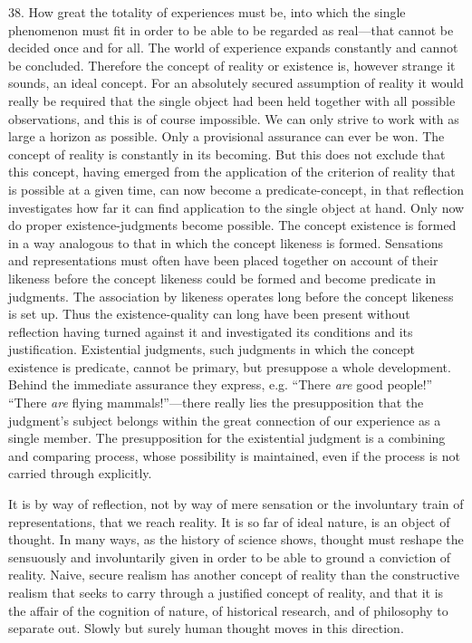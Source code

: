 \documentclass[12pt,a4paper]{book}
\newcommand{\opage}[1]{\marginnote{\footnotesize\textit{[#1]}}}
\begin{document}
38. How great the totality of experiences must be, into which the single
phenomenon must fit in order to be able to be regarded as real---that
cannot be decided once and for all. The world of experience expands
constantly and cannot be concluded. Therefore the concept of reality or
existence is, however strange it sounds, an ideal concept. For an
absolutely secured assumption of reality it would really be required that
the single object had been held together with all possible observations,
and this is of course impossible. We can only strive to work with as large
a horizon as possible. Only a provisional assurance can ever be won. The
concept of reality is constantly in its becoming. But this does not exclude
that this concept, having emerged from the application of the criterion of
reality that is possible at a given time, can now become a
predicate-concept, \opage{106}in that reflection investigates how far it can find
application to the single object at hand. Only now do proper
existence-judgments become possible. The concept existence is formed in a
way analogous to that in which the concept likeness is formed. Sensations
and representations must often have been placed together on account of
their likeness before the concept likeness could be formed and become
predicate in judgments. The association by likeness operates long before
the concept likeness is set up. Thus the existence-quality can long have
been present without reflection having turned against it and investigated
its conditions and its justification. Existential judgments, such judgments
in which the concept existence is predicate, cannot be primary, but
presuppose a whole development. Behind the immediate assurance they
express, e.g. ``There \emph{are} good people!'' ``There \emph{are} flying
mammals!''---there really lies the presupposition that the judgment's
subject belongs within the great connection of our experience as a single
member. The presupposition for the existential judgment is a combining and
comparing process, whose possibility is maintained, even if the process is
not carried through explicitly.

It is by way of reflection, not by way of mere sensation or the
involuntary train of representations, that we reach reality. It is so far
of ideal nature, is an object of thought. In many ways, as the history of
science shows, thought must reshape the sensuously and involuntarily given
in order to be able to ground a conviction of reality. Naive, secure
realism has another concept of reality than the constructive realism that
seeks to carry through a justified concept of reality, and that it is the
affair of the cognition of nature, of historical research, and of
philosophy to separate out. Slowly but surely human thought moves in this
direction.
\end{document}
